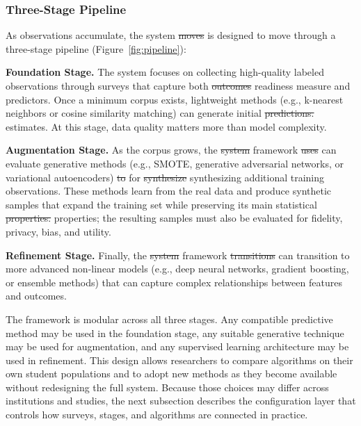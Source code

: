 \documentclass[letterpaper,11pt]{article}
\newcommand{\DIFdel}[1]{%
  \begingroup\setlength{\fboxsep}{0.5pt}%
  \colorbox{diffdelbg}{\textcolor{diffdeltext}{\sout{#1}}}%
  \endgroup}
\newcommand{\DIFadd}[1]{%
  \begingroup\setlength{\fboxsep}{0.5pt}%
  \colorbox{diffaddbg}{\textcolor{diffaddtext}{#1}}%
  \endgroup}
\begin{document}
\subsubsection{Three-Stage Pipeline}

As observations accumulate, the system \DIFdel{moves} \DIFadd{is} \DIFadd{designed} \DIFadd{to} \DIFadd{move} through a three-stage pipeline (Figure~\ref{fig:pipeline}):

\textbf{Foundation Stage.} The system focuses on collecting high-quality labeled observations through surveys that capture both \DIFdel{outcomes} \DIFadd{readiness} \DIFadd{measure} and predictors. Once a minimum corpus exists, lightweight methods (e.g., k-nearest neighbors or cosine similarity matching) can generate initial \DIFdel{predictions.} \DIFadd{estimates.} At this stage, data quality matters more than model complexity.

\textbf{Augmentation Stage.} As the corpus grows, the \DIFdel{system} \DIFadd{framework} \DIFdel{uses} \DIFadd{can} \DIFadd{evaluate} generative methods (e.g., SMOTE, generative adversarial networks, or variational autoencoders) \DIFdel{to} \DIFadd{for} \DIFdel{synthesize} \DIFadd{synthesizing} additional training observations. These methods learn from the real data and produce synthetic samples that expand the training set while preserving its main statistical \DIFdel{properties.} \DIFadd{properties;} \DIFadd{the} \DIFadd{resulting} \DIFadd{samples} \DIFadd{must} \DIFadd{also} \DIFadd{be} \DIFadd{evaluated} \DIFadd{for} \DIFadd{fidelity,} \DIFadd{privacy,} \DIFadd{bias,} \DIFadd{and} \DIFadd{utility.}

\textbf{Refinement Stage.} Finally, the \DIFdel{system} \DIFadd{framework} \DIFdel{transitions} \DIFadd{can} \DIFadd{transition} to more advanced non-linear models (e.g., deep neural networks, gradient boosting, or ensemble methods) that can capture complex relationships between features and outcomes.

The framework is modular across all three stages. Any compatible predictive method may be used in the foundation stage, any suitable generative technique may be used for augmentation, and any supervised learning architecture may be used in refinement. This design allows researchers to compare algorithms on their own student populations and to adopt new methods as they become available without redesigning the full system. Because those choices may differ across institutions and studies, the next subsection describes the configuration layer that controls how surveys, stages, and algorithms are connected in practice.
\end{document}
